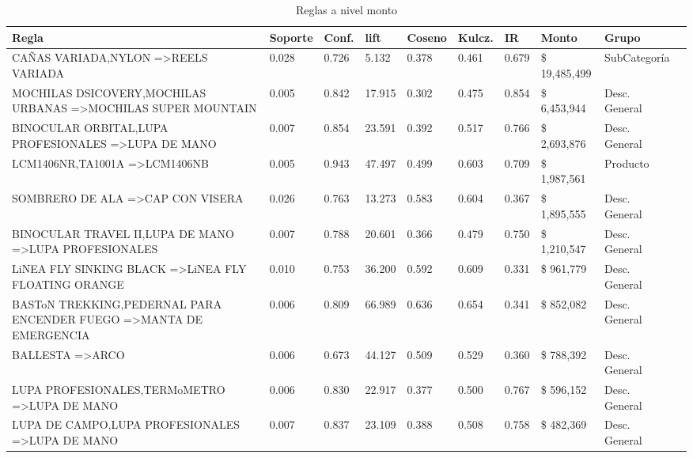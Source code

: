 \documentclass[]{article}
\begin{document}
	
	\begin{landscape}
		\begin{table}[htbp]
			\centering
			\caption{Reglas a nivel monto}
			\addtolength{\tabcolsep}{-3.5pt}
			\renewcommand{\arraystretch}{1.2} 
			\begin{tabular}{llllllllll}
				\textbf{Regla} & \textbf{Soporte} & \textbf{Conf.} & \textbf{lift} & \textbf{Coseno} & \textbf{Kulcz.} & \textbf{IR} & \textbf{Monto} & \textbf{Grupo} \\	
				\hline					
				{CAÑAS VARIADA,NYLON} =\textgreater {REELS VARIADA} & 0.028 & 0.726 & 5.132 & 0.378 & 0.461 & 0.679 &  \$ 19,485,499  & SubCategoría \\
				{MOCHILAS DSICOVERY,MOCHILAS URBANAS} =\textgreater {MOCHILAS SUPER MOUNTAIN} & 0.005 & 0.842 & 17.915 & 0.302 & 0.475 & 0.854 &  \$    6,453,944  & Desc. General \\
				{BINOCULAR ORBITAL,LUPA PROFESIONALES} =\textgreater {LUPA DE MANO} & 0.007 & 0.854 & 23.591 & 0.392 & 0.517 & 0.766 &  \$    2,693,876  & Desc. General \\
				{LCM1406NR,TA1001A} =\textgreater {LCM1406NB} & 0.005 & 0.943 & 47.497 & 0.499 & 0.603 & 0.709 &  \$    1,987,561  & Producto \\
				{SOMBRERO DE ALA} =\textgreater {CAP CON VISERA} & 0.026 & 0.763 & 13.273 & 0.583 & 0.604 & 0.367 &  \$    1,895,555  & Desc. General \\
				{BINOCULAR TRAVEL II,LUPA DE MANO} =\textgreater {LUPA PROFESIONALES} & 0.007 & 0.788 & 20.601 & 0.366 & 0.479 & 0.750 &  \$    1,210,547  & Desc. General \\
				{LiNEA FLY SINKING BLACK} =\textgreater {LiNEA FLY FLOATING ORANGE} & 0.010 & 0.753 & 36.200 & 0.592 & 0.609 & 0.331 &  \$       961,779  & Desc. General \\
				{BASToN TREKKING,PEDERNAL PARA ENCENDER FUEGO} =\textgreater {MANTA DE EMERGENCIA} & 0.006 & 0.809 & 66.989 & 0.636 & 0.654 & 0.341 &  \$       852,082  & Desc. General \\
				{BALLESTA} =\textgreater {ARCO} & 0.006 & 0.673 & 44.127 & 0.509 & 0.529 & 0.360 &  \$       788,392  & Desc. General \\
				{LUPA PROFESIONALES,TERMoMETRO} =\textgreater {LUPA DE MANO} & 0.006 & 0.830 & 22.917 & 0.377 & 0.500 & 0.767 &  \$       596,152  & Desc. General \\
				{LUPA DE CAMPO,LUPA PROFESIONALES} =\textgreater {LUPA DE MANO} & 0.007 & 0.837 & 23.109 & 0.388 & 0.508 & 0.758 &  \$       482,369  & Desc. General \\

\end{tabular}
\end{table}
\end{landscape}
\end{document}

